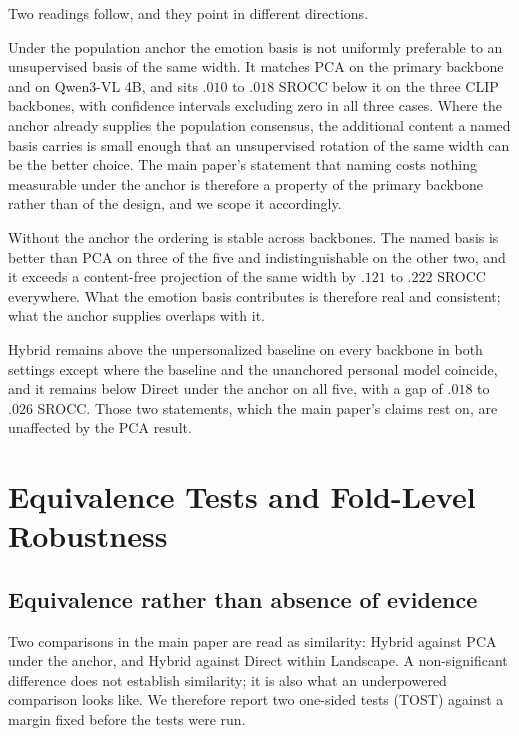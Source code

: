 Two readings follow, and they point in different directions.

Under the population anchor the emotion basis is not uniformly preferable to an
unsupervised basis of the same width. It matches PCA on the primary backbone
and on Qwen3-VL 4B, and sits $.010$ to $.018$ SROCC below it on the three CLIP
backbones, with confidence intervals excluding zero in all three cases. Where
the anchor already supplies the population consensus, the additional content a
named basis carries is small enough that an unsupervised rotation of the same
width can be the better choice. The main paper's statement that naming costs
nothing measurable under the anchor is therefore a property of the primary
backbone rather than of the design, and we scope it accordingly.

Without the anchor the ordering is stable across backbones. The named basis is
better than PCA on three of the five and indistinguishable on the other two,
and it exceeds a content-free projection of the same width by $.121$ to $.222$
SROCC everywhere. What the emotion basis contributes is therefore real and
consistent; what the anchor supplies overlaps with it.

Hybrid remains above the unpersonalized baseline on every backbone in both
settings except where the baseline and the unanchored personal model coincide,
and it remains below Direct under the anchor on all five, with a gap of $.018$
to $.026$ SROCC. Those two statements, which the main paper's claims rest on,
are unaffected by the PCA result.


\section{Equivalence Tests and Fold-Level Robustness}
\label{sec:supp_equivalence}

\subsection{Equivalence rather than absence of evidence}

Two comparisons in the main paper are read as similarity: Hybrid against PCA
under the anchor, and Hybrid against Direct within Landscape. A non-significant
difference does not establish similarity; it is also what an underpowered
comparison looks like. We therefore report two one-sided tests (TOST) against a
margin fixed before the tests were run.

